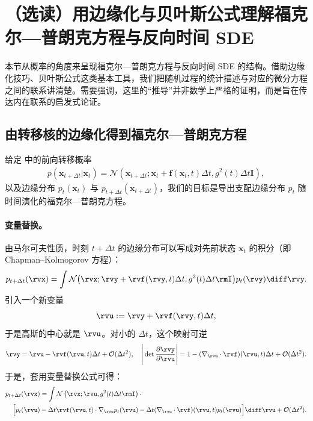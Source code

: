 \section{（选读）用边缘化与贝叶斯公式理解福克尔—普朗克方程与反向时间 SDE}\label{eq:heuristic-fpe-sde}
本节从概率的角度来呈现福克尔—普朗克方程与反向时间 SDE 的结构。借助边缘化技巧、贝叶斯公式这类基本工具，我们把随机过程的统计描述与对应的微分方程之间的联系讲清楚。需要强调，这里的“推导”并非数学上严格的证明，而是旨在传达内在联系的启发式论证。

\subsection{由转移核的边缘化得到福克尔—普朗克方程}\label{subsec:fpe-reason}
给定  中的前向转移概率
\begin{align*}
    p(\mathbf{x}_{t+\Delta t} | \mathbf{x}_t) = \mathcal{N}\left(\mathbf{x}_{t+\Delta t}; \mathbf{x}_t + \mathbf{f}(\mathbf{x}_t, t)\Delta t, g^2(t)\Delta t \mathbf{I}\right),
\end{align*}
以及边缘分布 $p_t(\mathbf{x}_t)$ 与 $p_{t+\Delta t}(\mathbf{x}_{t+\Delta t})$，我们的目标是导出支配边缘分布 $p_t$ 随时间演化的福克尔—普朗克方程。

\paragraph{变量替换。}
由马尔可夫性质，时刻 $t+\Delta t$ 的边缘分布可以写成对先前状态 $\mathbf{x}_t$ 的积分（即 Chapman--Kolmogorov 方程）：
\begin{align*}
p_{t+\Delta t}(\rvx)
= \int \mathcal N \big(\rvx; \rvy+\rvf(\rvy,t)\Delta t, g^2(t)\Delta t \rmI\big) p_t(\rvy) \diff\rvy.
\end{align*}
引入一个新变量
\[
\rvu  :=  \rvy+\rvf(\rvy,t)\Delta t,
\]
于是高斯的中心就是 $\rvu$。对小的 $\Delta t$，这个映射可逆
\[
\rvy  =  \rvu-\rvf(\rvu,t)\Delta t+\mathcal O(\Delta t^2),
\quad
\Bigg|\det\frac{\partial \rvy}{\partial \rvu}\Bigg|
 = 1-(\nabla_\rvu \cdot\rvf)(\rvu,t) \Delta t+\mathcal O(\Delta t^2).
\]
于是，套用变量替换公式可得：
\begin{align*}
    p_{t+\Delta t}(\rvx)
&= \int \mathcal N\left(\rvx;\rvu,g^2(t)\Delta t\rmI\right) \cdot
\\\quad\Big[p_t(\rvu)&-\Delta t \rvf(\rvu,t) \cdot \nabla_\rvu p_t(\rvu)
-\Delta t (\nabla_\rvu \cdot\rvf)(\rvu,t) p_t(\rvu)\Big] \diff\rvu
+\mathcal O(\Delta t^2).
\end{align*}

